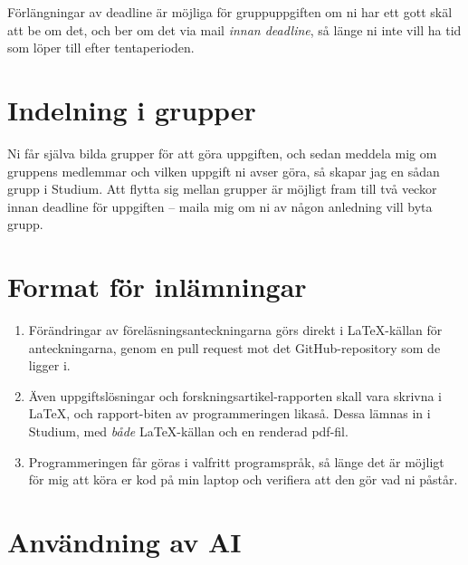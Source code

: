 \documentclass[nobib]{tufte-handout}
\begin{document}
Förlängningar av deadline är möjliga för gruppuppgiften om ni har ett gott skäl att be om det, och ber om det via mail \emph{innan deadline}, så länge ni inte vill ha tid som löper till efter tentaperioden.

\section{Indelning i grupper}

Ni får själva bilda grupper för att göra uppgiften, och sedan meddela mig om gruppens medlemmar och vilken uppgift ni avser göra, så skapar jag en sådan grupp i Studium. Att flytta sig mellan grupper är möjligt fram till två veckor innan deadline för uppgiften -- maila mig om ni av någon anledning vill byta grupp.

\section{Format för inlämningar}

\begin{enumerate}
	\item Förändringar av föreläsningsanteckningarna görs direkt i \LaTeX-källan för anteckningarna, genom en pull request mot det GitHub-repository som de ligger i.
	\item Även uppgiftslösningar och forskningsartikel-rapporten skall vara skrivna i \LaTeX, och rapport-biten av programmeringen likaså. Dessa lämnas in i Studium, med \emph{både} \LaTeX-källan och en renderad pdf-fil.
	\item Programmeringen får göras i valfritt programspråk, så länge det är möjligt för mig att köra er kod på min laptop och verifiera att den gör vad ni påstår.
\end{enumerate}

\section{Användning av AI}
\end{document}
